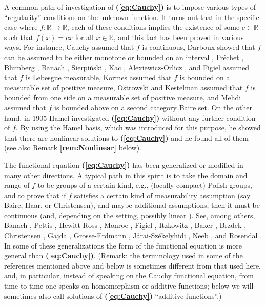 \documentclass[12 pt]{amsart}
\theoremstyle{definition}
\newcommand{\R}{\mathbb{R}}
\newcommand{\bref}[1]{\textbf{\ref{#1}}} %
\newcommand{\beqref}[1]{\textbf{(\ref{#1})}} %
\begin{document}
A common path of investigation of \beqref{eq:Cauchy} is to impose 
 various types of ``regularity'' conditions on the unknown function. It turns out that  in the specific case where $f:\R\to\R$, each of these conditions implies the existence of some $c\in\R$ such that $f(x)=cx$ for all $x\in \R$, and this fact has been proved in various ways. For instance, Cauchy \cite[pp. 103--106]{Cauchy1821} assumed that $f$ is continuous,  Darboux  showed that $f$ can be assumed to be either monotone \cite{Darboux} 
 or bounded on an interval \cite{Darboux1880},  
 Fr\'echet \cite{Frechet}, Blumberg \cite{Blumberg1919},  Banach \cite{BanachCauchy}, 
 Sierpi\'nski \cite{Sierpinski1,Sierpinski2},  Kac \cite{Kac},  Alexiewicz-Orlicz \cite{AlexiewiczOrlicz}, and Figiel \cite{Figiel1969} 
 assumed that $f$ is Lebesgue measurable, 
Kormes  \cite{Kormes} assumed that $f$ is bounded  on a measurable  set of positive measure, Ostrowski \cite{Ostrowski} 
and  Kestelman \cite{Kestelman} assumed that $f$ is bounded from one side on a measurable  set of positive measure,  and Mehdi \cite{Mehdi} assumed that $f$ is bounded above on a second category Baire set. On the other hand, in 1905 Hamel \cite{Hamel} investigated \beqref{eq:Cauchy} without any further condition of $f$. By using the Hamel basis, which was introduced for this  purpose, he showed that there are nonlinear solutions to \beqref{eq:Cauchy} and he found all of them (see also Remark \bref{rem:Nonlinear} below). 

The functional equation \beqref{eq:Cauchy} has been generalized or modified in many other directions. A typical path 
in this spirit is to take the domain and range of  $f$ to be groups of a certain kind, e.g., (locally compact) Polish groups, and to prove that if $f$ satisfies a certain kind of measurability assumption  (say Baire, Haar, or Christensen), and maybe additional assumptions, then it must be continuous (and, depending on the setting, possibly linear \cite[pp. 36--38]{AczelDhombres}). See, among others, Banach \cite[p. 23]{BanachBook}, Pettis \cite{PettisCauchy}, Hewitt-Ross \cite[p. 346]{HewittRoss}, Monroe \cite{Monroe}, Figiel \cite{Figiel1969}, Itzkowitz  \cite{Itzkowitz}, Baker \cite{Baker}, Brzdek \cite{Brzdek},  Christensen \cite{Christensen}, Gajda \cite{Gajda1986}, Grosse-Erdmann \cite{Grosse-Erdmann1989jour}, J{\'a}rai-Sz{\'e}kelyhidi \cite{JaraiSzekelyhidi1996jour}, Neeb \cite{Neeb}, and Rosendal \cite{Rosendal}. In some of these generalizations the form of the functional  equation is more general than \beqref{eq:Cauchy}. (Remark: the terminology used in some of the references mentioned above and below is sometimes different from that used here, and, in particular, instead of speaking on the Cauchy functional equation, from time to time one speaks on homomorphism or additive functions; below we will sometimes also call solutions of \beqref{eq:Cauchy} ``additive functions''.)
\end{document}
